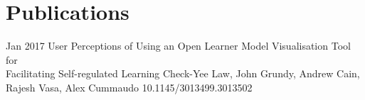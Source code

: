 \section{Publications}

  {Jan 2017}
  {User Perceptions of Using an Open Learner Model Visualisation Tool for\\Facilitating Self-regulated Learning
  }
  {Check-Yee Law, John Grundy, Andrew Cain, Rajesh Vasa, Alex Cummaudo}
  {10.1145/3013499.3013502}